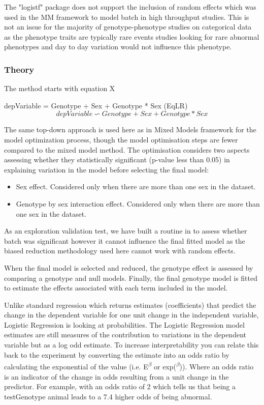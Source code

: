 \documentclass[12pt,a4paper]{article}
\begin{document}
The "logistf" package does not support the inclusion of random effects which was used in the MM framework to model batch in high throughput studies. This is not an issue for the majority of genotype-phenotype studies on categorical data as the phenotype traits are typically rare events studies looking for rare abnormal phenotypes and day to day variation would not influence this phenotype. 

\subsubsection{Theory}
The method starts with equation X

depVariable =  Genotype + Sex + Genotype * Sex 	(EqLR)
\[
depVariable \backsim Genotype + Sex +
Genotype*Sex \tag{Eq5}\label{EqLR}
\]

The same top-down approach is used here as in Mixed Models framework for the model optimization process, though the model optimisation steps are fewer compared to the mixed model method.  The optimisation considers two aspects assessing whether they statistically significant (p-value less than 0.05) in explaining variation in the model before selecting the final model: 

\begin{itemize}
\item Sex effect. Considered only when there are more than one sex in the dataset.
\item Genotype by sex interaction effect. Considered only when there are more than one sex in the dataset.
\end{itemize}
As an exploration validation test, we have built a routine in to assess whether batch was significant however it cannot influence the final fitted model as the biased reduction methodology used here cannot work with random effects.

When the final model is selected and reduced, the genotype effect is assessed by comparing a genotype and null models. Finally, the final genotype model is fitted to estimate the effects associated with each term included in the model.

Unlike standard regression which returns estimates (coefficients) that predict the change in the dependent variable for one unit change in the independent variable, Logistic Regression is looking at probabilities. The Logistic Regression model estimates are still measures of the contribution to variations in the dependent variable but as a log odd estimate. To increase interpretability you can relate this back to the experiment by converting the estimate into an odds ratio by calculating the exponential of the value (i.e. E\textsuperscript{$\beta$} or exp(\textsuperscript{$\beta$})). Where an odds ratio is an indicator of the change in odds resulting from a unit change in the predictor. For example, with an odds ratio of 2 which tells us that being a testGenotype animal leads to a 7.4 higher odds of being abnormal.
\end{document}
